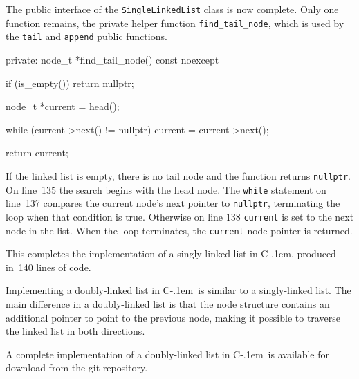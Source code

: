 \documentclass{article}
\newcommand{\Cpp}{\mbox{C\kern-.1em\raisebox{.35ex}{\smaller{\smaller{+\kern-0.05em+}}}}}
\begin{document}
  The public interface of the \verb|SingleLinkedList| class is now complete. Only one function remains, the private helper function \verb|find_tail_node|, which is used by the \verb|tail| and \verb|append| public functions.
  \begin{lstcpp}
private:
  node_t *find_tail_node() const noexcept {
    if (is_empty())
      return nullptr;

    node_t *current = head();

    while (current->next() != nullptr)
      current = current->next();

    return current;
  }\end{lstcpp}
  If the linked list is empty, there is no tail node and the function returns \verb|nullptr|. On line~135 the search begins with the head node. The \verb|while| statement on line~137 compares the current node's next pointer to \verb|nullptr|, terminating the loop when that condition is true. Otherwise on line 138 \verb|current| is set to the next node in the list. When the loop terminates, the \verb|current| node pointer is returned.

  This completes the implementation of a singly-linked list in \Cpp, produced in~140 lines of code.

  Implementing a doubly-linked list in \Cpp\ is similar to a singly-linked list. The main difference in a doubly-linked list is that the node structure contains an additional pointer to point to the previous node, making it possible to traverse the linked list in both directions.

  A complete implementation of a doubly-linked list in \Cpp\ is available for download from the git repository.
\end{document}
